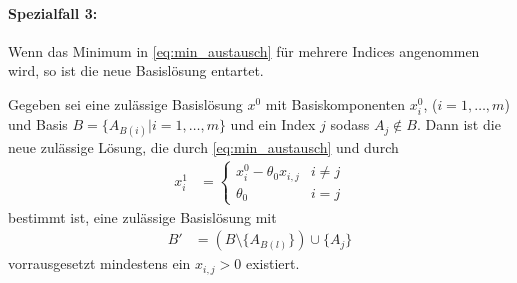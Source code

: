 \paragraph*{Spezialfall 3:} Wenn das Minimum in \eqref{eq:min_austausch} für mehrere Indices angenommen wird, so ist die neue Basislösung entartet.

\begin{theorem}
Gegeben sei eine zulässige Basislösung $x^0$ mit Basiskomponenten $x_i^0$, ($i=1,\dotsc,m$) und Basis $B=\{A_{B(i)} | i=1,\dotsc,m\}$ und ein Index $j$ sodass $A_j \notin B$. Dann ist die neue zulässige Lösung, die durch \eqref{eq:min_austausch} und durch
\begin{align}
x_i^1 &= \begin{cases}
x_i^0 - \theta_0 x_{i,j} & i \neq j\\
\theta_0 & i = j\end{cases}
\end{align}
bestimmt ist, eine zulässige Basislösung mit
\begin{align*}
B' &= (B \setminus \{A_{B(l)}\} ) \cup \{A_j\}
\end{align*} vorrausgesetzt mindestens ein $x_{i,j} > 0$ existiert.
\end{theorem}
